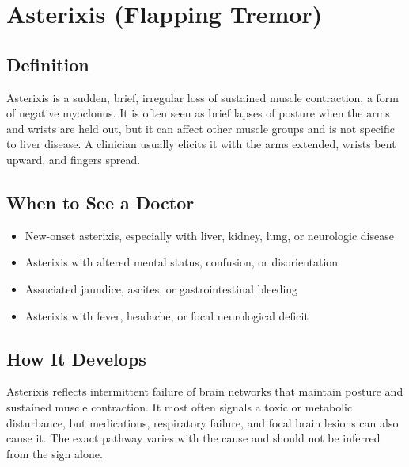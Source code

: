 \chapter{Asterixis (Flapping Tremor)}

\section*{Definition}
Asterixis is a sudden, brief, irregular loss of sustained muscle contraction, a form of negative myoclonus. It is often seen as brief lapses of posture when the arms and wrists are held out, but it can affect other muscle groups and is not specific to liver disease. A clinician usually elicits it with the arms extended, wrists bent upward, and fingers spread.

\section*{When to See a Doctor}

\begin{itemize}
 \item New-onset asterixis, especially with liver, kidney, lung, or neurologic disease
 \item Asterixis with altered mental status, confusion, or disorientation
 \item Associated jaundice, ascites, or gastrointestinal bleeding
 \item Asterixis with fever, headache, or focal neurological deficit
\end{itemize}

\section*{How It Develops}
Asterixis reflects intermittent failure of brain networks that maintain posture and sustained muscle contraction. It most often signals a toxic or metabolic disturbance, but medications, respiratory failure, and focal brain lesions can also cause it. The exact pathway varies with the cause and should not be inferred from the sign alone.

